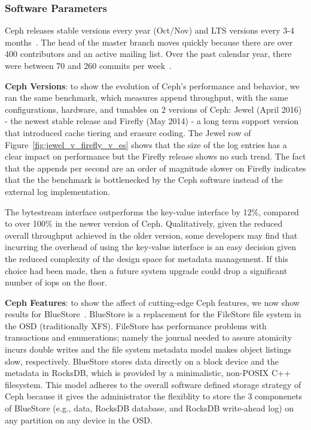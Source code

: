 \documentclass[10pt,twocolumn]{article}
\begin{document}
\subsubsection{Software Parameters}

Ceph releases stable versions every year (Oct/Nov) and LTS versions every 3-4
months~\cite{website:ceph-releases}. The head of the master branch moves
quickly because there are over 400 contributors and an active mailing list.
Over the past calendar year, there were between 70 and 260 commits per
week~\cite{website:ceph-github}. 

\textbf{Ceph Versions}: to show the evolution of Ceph's performance and
behavior, we ran the same benchmark, which measures append throughput, with the
same configurations, hardware, and tunables on 2 versions of Ceph: Jewel (April
2016) - the newest stable release and Firefly (May 2014) - a long term support
version that introduced cache tiering and erasure coding. The Jewel row of 
Figure~\ref{fig:jewel_v_firefly_v_es} shows that the size of the log entries
has a clear impact on performance but the Firefly release shows no such trend.
The fact that the appends per second are an order of magnitude slower on
Firefly indicates that the the benchmark is bottlenecked by the Ceph software
instead of the external log implementation. 

The bytestream interface outperforms the key-value interface by 12\%, compared
to over 100\% in the newer version of Ceph. Qualitatively, given the reduced
overall throughput achieved in the older version, some developers may find that
incurring the overhead of using the key-value interface is an easy decision
given the reduced complexity of the design space for metadata management. If
this choice had been made, then a future system upgrade could drop a
significant number of iops on the floor.

\textbf{Ceph Features}: to show the affect of cutting-edge Ceph features, we
now show results for BlueStore~\cite{weil:vault2016-bluestore}. BlueStore is a
replacement for the FileStore file system in the OSD (traditionally XFS).
FileStore has performance problems with transactions and enumerations; namely
the journal needed to assure atomicity incurs double writes and the file system
metadata model makes object listings slow, respectively. BlueStore stores data
directly on a block device and the metadata in RocksDB, which is provided by a
minimalistic, non-POSIX C++ filesystem. This model adheres to the overall
software defined storage strategy of Ceph because it gives the administrator
the flexiblity to store the 3 componenets of BlueStore (e.g., data, RocksDB
database, and RocksDB write-ahead log) on any partition on any device in the
OSD. 
\end{document}
